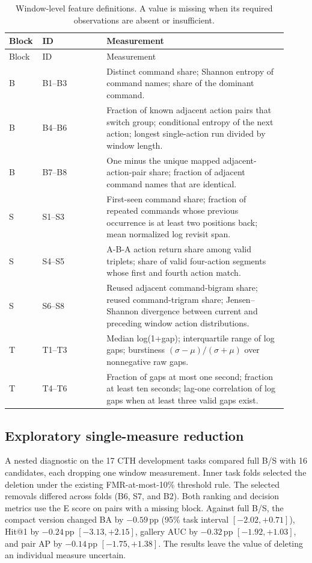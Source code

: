 \documentclass[10pt]{article}
\renewcommand{\arraystretch}{1.08}
\newcommand{\pp}{\,\mathrm{pp}}
\newcommand{\compacttable}{\footnotesize\setlength{\tabcolsep}{3pt}\renewcommand{\arraystretch}{1.08}}
\begin{document}
\begingroup\compacttable
\begin{longtable}{@{}p{0.08\linewidth}p{0.22\linewidth}p{0.62\linewidth}@{}}
\caption{Window-level feature definitions. A value is missing when its required observations are absent or insufficient.}\label{tab:features}\\
\toprule Block & ID & Measurement \\
\midrule\endfirsthead
\toprule Block & ID & Measurement \\
\midrule\endhead
B & B1--B3 & Distinct command share; Shannon entropy of command names; share of the dominant command. \\
B & B4--B6 & Fraction of known adjacent action pairs that switch group; conditional entropy of the next action; longest single-action run divided by window length. \\
B & B7--B8 & One minus the unique mapped adjacent-action-pair share; fraction of adjacent command names that are identical. \\
S & S1--S3 & First-seen command share; fraction of repeated commands whose previous occurrence is at least two positions back; mean normalized log revisit span. \\
S & S4--S5 & A-B-A action return share among valid triplets; share of valid four-action segments whose first and fourth action match. \\
S & S6--S8 & Reused adjacent command-bigram share; reused command-trigram share; Jensen--Shannon divergence between current and preceding window action distributions. \\
T & T1--T3 & Median log(1+gap); interquartile range of log gaps; burstiness $(\sigma-\mu)/(\sigma+\mu)$ over nonnegative raw gaps. \\
T & T4--T6 & Fraction of gaps at most one second; fraction at least ten seconds; lag-one correlation of log gaps when at least three valid gaps exist. \\
\bottomrule
\end{longtable}
\endgroup

\subsection{Exploratory single-measure reduction}
A nested diagnostic on the 17 CTH development tasks compared full B/S with 16 candidates, each dropping one window measurement. Inner task folds selected the deletion under the existing FMR-at-most-10\% threshold rule. The selected removals differed across folds (B6, S7, and B2). Both ranking and decision metrics use the E score on pairs with a missing block. Against full B/S, the compact version changed BA by $-0.59\pp$ (95\% task interval $[-2.02,+0.71]$), Hit@1 by $-0.24\pp$ $[-3.13,+2.15]$, gallery AUC by $-0.32\pp$ $[-1.92,+1.03]$, and pair AP by $-0.14\pp$ $[-1.75,+1.38]$. The results leave the value of deleting an individual measure uncertain.
\end{document}
